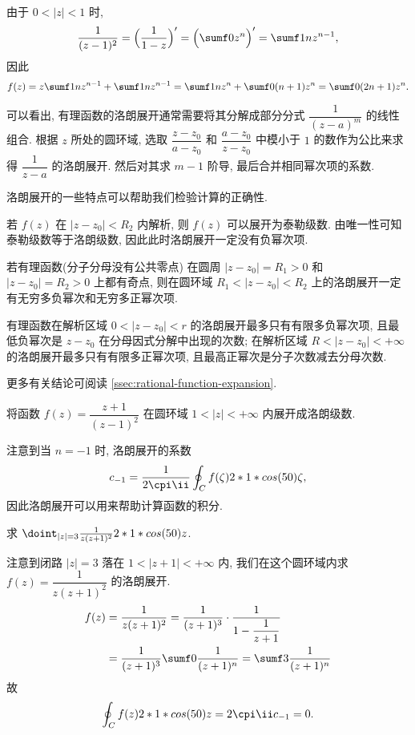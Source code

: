 \begin{solution}[解法二]
  由于 $0<|z|<1$ 时,
  \[
     \frac{1}{(z-1)^2}
    =\Bigl(\frac1{1-z}\Bigr)'
    =\Bigl(\sumf0 z^n\Bigr)'
    =\sumf1 nz^{n-1},
  \]
  因此
  \[
     f(z)
    =z\sumf1 nz^{n-1}+\sumf1 nz^{n-1}
    =\sumf1 nz^n+\sumf0 (n+1)z^n
    =\sumf0 (2n+1)z^n.
  \]
\end{solution}

可以看出, 有理函数的洛朗展开通常需要将其分解成部分分式 $\dfrac1{(z-a)^m}$ 的线性组合.
根据 $z$ 所处的圆环域, 选取 $\dfrac{z-z_0}{a-z_0}$ 和 $\dfrac{a-z_0}{z-z_0}$ 中模小于 $1$ 的数作为公比来求得 $\dfrac1{z-a}$ 的洛朗展开.
然后对其求 $m-1$ 阶导, 最后合并相同幂次项的系数.

洛朗展开的一些特点可以帮助我们检验计算的正确性.
\begin{enuma}
  \item 若 $f(z)$ 在 $|z-z_0|<R_2$ 内解析, 则 $f(z)$ 可以展开为泰勒级数. 由唯一性可知泰勒级数等于洛朗级数, 因此此时洛朗展开一定没有负幂次项.
  \item 若有理函数(分子分母没有公共零点) 在圆周 $|z-z_0|=R_1>0$ 和 $|z-z_0|=R_2>0$ 上都有奇点, 则在圆环域 $R_1<|z-z_0|<R_2$ 上的洛朗展开一定有无穷多负幂次和无穷多正幂次项.
  \item 有理函数在解析区域 $0<|z-z_0|<r$ 的洛朗展开最多只有有限多负幂次项, 且最低负幂次是 $z-z_0$ 在分母因式分解中出现的次数; 在解析区域 $R<|z-z_0|<+\infty$ 的洛朗展开最多只有有限多正幂次项, 且最高正幂次是分子次数减去分母次数.
\end{enuma}

更多有关结论可阅读 \ref{ssec:rational-function-expansion}.

\begin{exercise}
  将函数 $f(z)=\dfrac{z+1}{(z-1)^2}$ 在圆环域 $1<|z|<+\infty$ 内展开成洛朗级数.
\end{exercise}

注意到当 $n=-1$ 时, 洛朗展开的系数
\[
  c_{-1}=\frac1{2\cpi\ii}\oint_C f(\zeta)\d\zeta,
\]
因此洛朗展开可以用来帮助计算函数的积分.

\begin{example}
  求 $\doint_{|z|=3}\frac1{z(z+1)^2}\d z$.
\end{example}

\begin{solution}
  注意到闭路 $|z|=3$ 落在 $1<|z+1|<+\infty$ 内, 我们在这个圆环域内求 $f(z)=\dfrac1{z(z+1)^2}$ 的洛朗展开.
  \begin{align*}
     f(z)&
    =\frac1{z(z+1)^2}=\frac1{(z+1)^3}\cdot\frac1{1-\dfrac1{z+1}}\\&
    =\frac1{(z+1)^3}\sumf0 \frac1{(z+1)^n}
    =\sumf3 \frac1{(z+1)^n}
  \end{align*}
  故
  \[
    \oint_Cf(z)\d z=2\cpi\ii  c_{-1}=0.
  \]
\end{solution}

